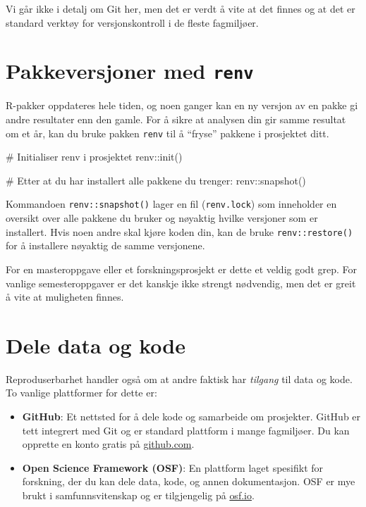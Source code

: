 \documentclass[
  norsk,
  letterpaper,
  DIV=11,
  numbers=noendperiod]{scrreprt}
\newenvironment{Shaded}{\begin{snugshade}}{\end{snugshade}}
\newcommand{\CommentTok}[1]{\textcolor[rgb]{0.37,0.37,0.37}{#1}}
\newcommand{\FunctionTok}[1]{\textcolor[rgb]{0.28,0.35,0.67}{#1}}
\newcommand{\NormalTok}[1]{\textcolor[rgb]{0.00,0.23,0.31}{#1}}
\newcommand{\SpecialCharTok}[1]{\textcolor[rgb]{0.37,0.37,0.37}{#1}}
\theoremstyle{definition}
\theoremstyle{remark}
\begin{document}
Vi går ikke i detalj om Git her, men det er verdt å vite at det finnes
og at det er standard verktøy for versjonskontroll i de fleste
fagmiljøer.

\section{\texorpdfstring{Pakkeversjoner med
\texttt{renv}}{Pakkeversjoner med renv}}\label{pakkeversjoner-med-renv}

R-pakker oppdateres hele tiden, og noen ganger kan en ny versjon av en
pakke gi andre resultater enn den gamle. For å sikre at analysen din gir
samme resultat om et år, kan du bruke pakken \texttt{renv} til å
``fryse'' pakkene i prosjektet ditt.

\begin{Shaded}
\begin{Highlighting}[]
\CommentTok{\# Initialiser renv i prosjektet}
\NormalTok{renv}\SpecialCharTok{::}\FunctionTok{init}\NormalTok{()}

\CommentTok{\# Etter at du har installert alle pakkene du trenger:}
\NormalTok{renv}\SpecialCharTok{::}\FunctionTok{snapshot}\NormalTok{()}
\end{Highlighting}
\end{Shaded}

Kommandoen \texttt{renv::snapshot()} lager en fil (\texttt{renv.lock})
som inneholder en oversikt over alle pakkene du bruker og nøyaktig
hvilke versjoner som er installert. Hvis noen andre skal kjøre koden
din, kan de bruke \texttt{renv::restore()} for å installere nøyaktig de
samme versjonene.

For en masteroppgave eller et forskningsprosjekt er dette et veldig godt
grep. For vanlige semesteroppgaver er det kanskje ikke strengt
nødvendig, men det er greit å vite at muligheten finnes.

\section{Dele data og kode}\label{dele-data-og-kode}

Reproduserbarhet handler også om at andre faktisk har \emph{tilgang} til
data og kode. To vanlige plattformer for dette er:

\begin{itemize}
\item
  \textbf{GitHub}: Et nettsted for å dele kode og samarbeide om
  prosjekter. GitHub er tett integrert med Git og er standard plattform
  i mange fagmiljøer. Du kan opprette en konto gratis på
  \href{https://github.com}{github.com}.
\item
  \textbf{Open Science Framework (OSF)}: En plattform laget spesifikt
  for forskning, der du kan dele data, kode, og annen dokumentasjon. OSF
  er mye brukt i samfunnsvitenskap og er tilgjengelig på
  \href{https://osf.io}{osf.io}.
\end{itemize}
\end{document}
